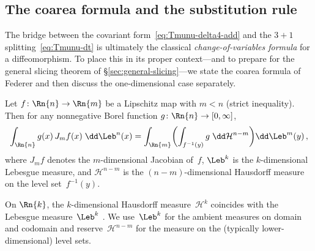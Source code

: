 
\subsection{The coarea formula and the substitution rule}%
\label{sec:coarea}

The bridge between the covariant
form~\eqref{eq:Tmunu-delta4-add} and the $3{+}1$
splitting~\eqref{eq:Tmunu-dt} is ultimately the classical
\emph{change-of-variables formula} for a diffeomorphism.  To place
this in its proper context---and to prepare for the general slicing
theorem of \S\ref{sec:general-slicing}---we state the coarea formula
of Federer and then discuss the one-dimensional case separately.

\begin{theorem}%
\label{thm:coarea}
  Let $f\colon \Rn{n} \to \Rn{m}$ be a Lipschitz map with
  $m < n$ (strict inequality).  Then for any nonnegative Borel function
  $g\colon \Rn{n} \to [0,\infty]$,
  \begin{equation}\label{eq:coarea-general}
    \int_{\Rn{n}} g(x)\,J_m f(x)\;\dd\Leb^n(x)
      = \int_{\Rn{m}}
        \biggl(\int_{f^{-1}(y)}
          g\;\dd\mathcal{H}^{n-m}\biggr)
        \dd\Leb^m(y)\,,
  \end{equation}
  where $J_m f$ denotes the $m$-dimensional Jacobian of~$f$,
  $\Leb^k$ is the $k$-dimensional Lebesgue measure, and
  $\mathcal{H}^{n-m}$ is the $(n{-}m)$-dimensional Hausdorff
  measure on the level set~$f^{-1}(y)$.
\end{theorem}

\begin{remark}\label{rem:Hausdorff-Lebesgue}
  On $\Rn{k}$, the $k$-dimensional Hausdorff measure~$\mathcal{H}^k$
  coincides with the Lebesgue measure~$\Leb^k$
  \cite[2.10.35]{Federer69}.  We use~$\Leb^k$ for the ambient
  measures on domain and codomain and reserve~$\mathcal{H}^{n-m}$ for
  the measure on the (typically lower-dimensional) level sets.
\end{remark}

